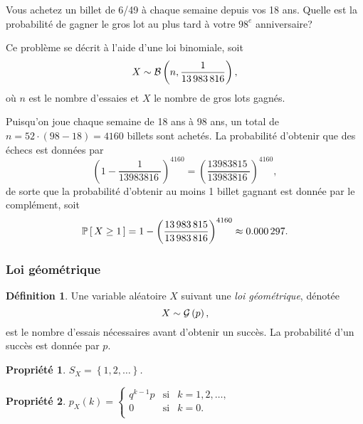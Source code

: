 \documentclass[11pt]{article}
\makeatletter
\renewcommand\P[1]{%
	\ensuremath{%
		\mathbb{P}\left[\,#1\,\right]%
	}%
}%
\newcommand\Bin[2]{%
	\ensuremath{%
		\mathcal{B}\left(#1,#2\right)%
	}%
}%
\newcommand\Geo[1]{%
	\ensuremath{%
		\mathcal{G}\left(#1\right)%
	}%
}%
\newtheorem{property}{Propriété}
\theoremstyle{remark}
\theoremstyle{definition}
\newtheorem*{@definition}{Définition}
\newenvironment{definition}{%
	\begin{@definition}%
}{%
	\end{@definition}%
	\setcounter{property}{0}%
}
\makeatother
\begin{document}
\begin{exemple}
	Vous achetez un billet de 6/49 à chaque semaine depuis vos 18 ans. Quelle
	est la probabilité de gagner le gros lot au plus tard à votre $98^e$
	anniversaire?
	
	Ce problème se décrit à l'aide d'une loi binomiale, soit
	\begin{equation*}
		X\sim\Bin{n}{\frac{1}{\SI{13983816}{}}},
	\end{equation*}
	où $n$ est le nombre d'essaies et $X$ le nombre de gros lots gagnés.
	\vspace{-1mm}

	Puisqu'on joue chaque semaine de 18 ans à 98 ans, un total de
	$n=52\cdot(98-18)=4160$ billets sont achetés. La probabilité d'obtenir que
	des échecs est données par
	\begin{equation*}
		\left(1-\frac{1}{\SI{13983816}{}}\right)^{4160}=
		\left(\frac{\SI{13983815}{}}{\SI{13983816}{}}\right)^{4160},
	\end{equation*}
	de sorte que la probabilité d'obtenir au moins 1 billet gagnant est donnée
	par le complément, soit
	\begin{equation*}
		\P{X\geq 1}
		=1-\left(\frac{\SI{13983815}{}}{\SI{13983816}{}}\right)^{4160}
		\approx\SI{0.000297}{}.
	\end{equation*}
\end{exemple}

\subsubsection{Loi géométrique}
\begin{definition}
	Une variable aléatoire $X$ suivant une \textit{loi géométrique}, dénotée
	\begin{equation*}
		X\sim\Geo{p},
	\end{equation*}
	est le nombre d'essais nécessaires avant d'obtenir un succès. La
	probabilité d'un succès est donnée par $p$.
\end{definition}

\begin{property}
	$S_X=\left\{1,2,\dots\right\}$.
\end{property}

\begin{property}
	$p_X(k)=\left\{
		\begin{matrix}
			q^{k-1}p & \text{si} & k=1,2,\dots,\\
			0        & \text{si} & k=0.\\
		\end{matrix}
	\right.$
\end{property}
\end{document}
